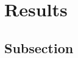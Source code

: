 \graphicspath{{images/}}

\section{Results}
\label{sec:results}
\citep{palkova1997}

\subsection{Subsection}

